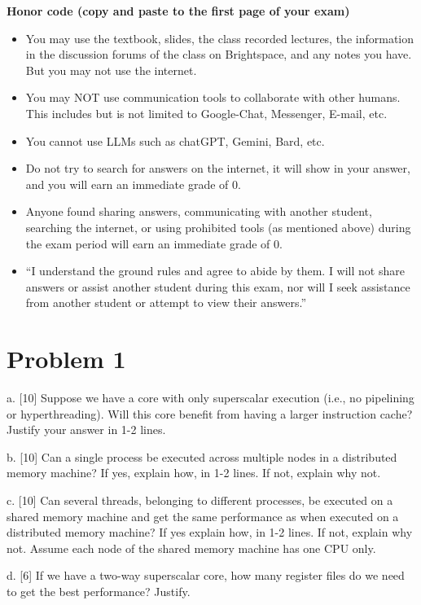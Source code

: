 \documentclass{article}
\begin{document}
\hrulefill

\textbf{Honor code (copy and paste to the first page of your exam)}
\begin{itemize}
    \item You may use the textbook, slides, the class recorded lectures, the information in the discussion forums of the class on Brightspace, and any notes you have. But you may not use the internet.
    \item You may NOT use communication tools to collaborate with other humans. This includes but is not limited to Google-Chat, Messenger, E-mail, etc.
    \item You cannot use LLMs such as chatGPT, Gemini, Bard, etc.
    \item Do not try to search for answers on the internet, it will show in your answer, and you will earn an immediate grade of 0.
    \item Anyone found sharing answers, communicating with another student, searching the internet, or using prohibited tools (as mentioned above) during the exam period will earn an immediate grade of 0.
    \item “I understand the ground rules and agree to abide by them. I will not share answers or assist another student during this exam, nor will I seek assistance from another student or attempt to view their answers.”
\end{itemize}

\hrulefill

\section*{Problem 1}
a. [10]  Suppose we have a core with only superscalar execution (i.e., no pipelining or hyperthreading). Will this core benefit from having a larger instruction cache? Justify your answer in 1-2 lines.

b. [10] Can a single process be executed across multiple nodes in a distributed memory machine? If yes, explain how, in 1-2 lines. If not, explain why not.

c. [10] Can several threads, belonging to different processes, be executed on a shared memory machine and get the same performance as when executed on a distributed memory machine? If yes explain how, in 1-2 lines. If not, explain why not. Assume each node of the shared memory machine has one CPU only.

d. [6] If we have a two-way superscalar core, how many register files do we need to get the best performance? Justify.
\end{document}
